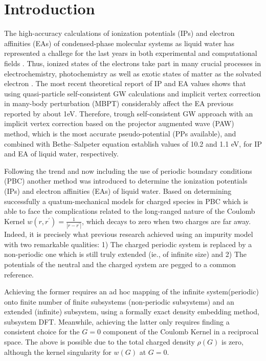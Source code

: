 \documentclass[12pt,a4paper]{article}
\begin{document}
\section{Introduction}

The high-accuracy calculations of ionization potentials (IPs) and electron affinities (EAs) of condensed-phase molecular systems as liquid water has 
represented a challege for the last years in both experimental and computational fields \cite{tolle2019charged,gaiduk2018electron,gaiduk2016photoelectron,seidel2016valence}. Thus, ionized states of the electrons take part in many crucial processes in electrochemistry, photochemistry as well as
exotic states of matter as the solvated electron \cite{ambrosio2017electronic}. The most recent theoretical report of IP and EA values
\cite{ziaei2018probing} shows that using quasi-particle self-consistent GW calculations and implicit vertex correction in many-body perturbation
(MBPT) considerably affect the EA previous reported \cite{gaiduk2018electron} by about 1eV. Therefore, trough self-consistent GW approach with an
implicit vertex correction based on the projector augmented wave (PAW) method, which is the most accurate pseudo-potential (PPs available),
and combined with Bethe–Salpeter equation establish values of 10.2 and 1.1 eV, for IP and EA of liquid water, respectively.

Following the trend and now including the use of periodic boundary conditions (PBC) another method was introduced \cite{tolle2019charged}
to determine the ionization potentials (IPs) and electron affinities (EAs) of liquid water. Based on determining successfully a quatum-mechanical
models for charged species in PBC which is able to face the complications related to the long-ranged nature of the Coulomb Kernel
$ w(r,r^{'}) = \frac {1}{|r - r^{'}|}$, which decays to zero when two charges are far away. Indeed, it is precisely what previous research achieved
using an impurity model with two remarkable qualities: 1) The charged periodic system is replaced by a non-periodic one which is still truly
extended (ie., of infinite size) and 2) The potentials of the neutral and the charged system are pegged to a common reference. 

Achieving the former requires an ad hoc mapping of the infinite system(periodic) onto finite number of finite subsystems
(non-periodic subsystems) and an extended (infinite) subsystem, using a formally exact density embedding method, subsystem DFT. Meanwhile, achieving
the latter only requires finding a consistent choice for the $G = 0$ component of the Coulomb Kernel in a reciprocal space. The above is possible due
to the total charged density $\rho (G)$ is zero, although the kernel singularity for $w(G)$ at $G = 0$.
\end{document}
